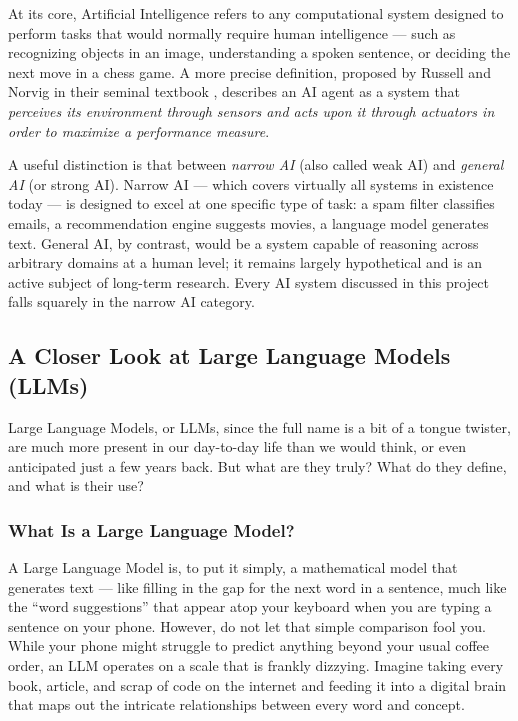 \documentclass[a4paper,11pt]{article}
\begin{document}
At its core, Artificial Intelligence refers to any computational system
designed to perform tasks that would normally require human intelligence ---
such as recognizing objects in an image, understanding a spoken sentence,
or deciding the next move in a chess game. A more precise definition,
proposed by Russell and Norvig in their seminal textbook \cite{russell2010ai},
describes an AI agent as a system that \emph{perceives its environment through
sensors and acts upon it through actuators in order to maximize a performance
measure}.
 
A useful distinction is that between \emph{narrow AI} (also called weak AI)
and \emph{general AI} (or strong AI). Narrow AI --- which covers virtually
all systems in existence today --- is designed to excel at one specific type
of task: a spam filter classifies emails, a recommendation engine suggests
movies, a language model generates text. General AI, by contrast, would be
a system capable of reasoning across arbitrary domains at a human level; it
remains largely hypothetical and is an active subject of long-term research.
Every AI system discussed in this project falls squarely in the narrow AI
category.
\subsection{A Closer Look at Large Language Models (LLMs)}

Large Language Models, or LLMs, since the full name is a bit of a tongue
twister, are much more present in our day-to-day life than we would think,
or even anticipated just a few years back. But what are they truly? What do
they define, and what is their use? \cite{llm_intro_placeholder}

\subsubsection{What Is a Large Language Model?}

A Large Language Model is, to put it simply, a mathematical model that
generates text --- like filling in the gap for the next word in a sentence,
much like the ``word suggestions'' that appear atop your keyboard when you
are typing a sentence on your phone. However, do not let that simple
comparison fool you. While your phone might struggle to predict anything
beyond your usual coffee order, an LLM operates on a scale that is frankly
dizzying. Imagine taking every book, article, and scrap of code on the
internet and feeding it into a digital brain that maps out the intricate
relationships between every word and concept. \cite{llm_scale_placeholder}
\end{document}

